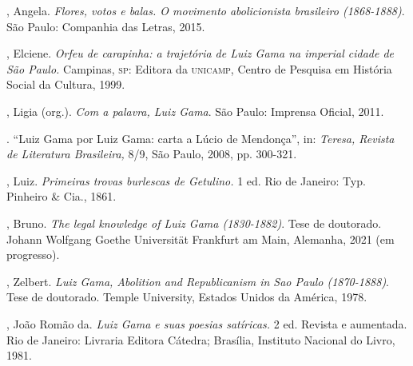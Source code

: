 \begin{bibliohedra}
, Angela. \emph{Flores, votos e balas. O movimento abolicionista
brasileiro (1868-1888)}. São Paulo: Companhia das Letras, 2015.

, Elciene. \emph{Orfeu de carapinha: a trajetória de Luiz Gama na
imperial cidade de São Paulo.} Campinas, \textsc{sp}: Editora da \textsc{unicamp}, Centro
de Pesquisa em História Social da Cultura, 1999.

, Ligia (org.). \emph{Com a palavra, Luiz Gama}. São Paulo:
Imprensa Oficial, 2011.

\titidem. ``Luiz Gama por Luiz Gama: carta
a Lúcio de Mendonça'', in: \emph{Teresa, Revista de Literatura
Brasileira,} 8/9, São Paulo, 2008, pp. 300-321.

, Luiz. \emph{Primeiras trovas burlescas de Getulino.} 1 ed. Rio de
Janeiro: Typ. Pinheiro \& Cia., 1861.

, Bruno. \emph{The legal knowledge of Luiz Gama (1830-1882)}. Tese
de doutorado. Johann Wolfgang Goethe Universität Frankfurt am Main,
Alemanha, 2021 (em progresso).

, Zelbert. \emph{Luiz Gama, Abolition and Republicanism in Sao
Paulo (1870-1888)}. Tese de doutorado. Temple University, Estados Unidos
da América, 1978.

, João Romão da. \emph{Luiz Gama e suas poesias satíricas.} 2 ed.
Revista e aumentada. Rio de Janeiro: Livraria Editora Cátedra; Brasília,
Instituto Nacional do Livro, 1981.
\end{bibliohedra}
